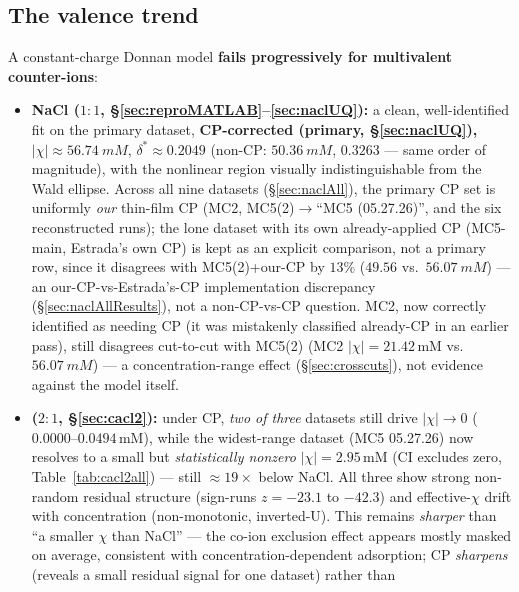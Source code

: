 \documentclass[11pt]{article}
\newcommand{\dstar}{\delta^{*}}
\begin{document}
\subsection{The valence trend}\label{sec:valencetrend}
A constant-charge Donnan model \textbf{fails progressively for
multivalent counter-ions}:
\begin{itemize}[itemsep=2pt]
  \item \textbf{NaCl ($1{:}1$, \S\ref{sec:reproMATLAB}--\ref{sec:naclUQ}):} a
        clean, well-identified fit on the primary dataset, \textbf{CP-corrected
        (primary, \S\ref{sec:naclUQ}), $|\chi|\approx\SI{56.74}{mM}$},
        $\dstar\approx0.2049$ (non-CP: $\SI{50.36}{mM}$, $0.3263$ --- same order
        of magnitude), with the
        nonlinear region visually indistinguishable from the Wald ellipse.
        Across all nine datasets (\S\ref{sec:naclAll}), the primary CP set is
        uniformly \emph{our} thin-film CP (MC2, MC5(2)$\to$``MC5 (05.27.26)'',
        and the six reconstructed runs); the lone dataset with its own
        already-applied CP
        (MC5-main, Estrada's own CP) is kept as an explicit comparison, not a primary row, since
        it disagrees with MC5(2)+our-CP by $13\%$ ($49.56$ vs.\
        $\SI{56.07}{mM}$) --- an our-CP-vs-Estrada's-CP implementation
        discrepancy (\S\ref{sec:naclAllResults}), not a non-CP-vs-CP question.
        MC2, now correctly identified as needing CP (it was mistakenly
        classified already-CP in an earlier pass), still disagrees
        cut-to-cut with MC5(2) (MC2 $|\chi|=21.42$\,mM vs.\ $\SI{56.07}{mM}$) ---
        a concentration-range
        effect
        (\S\ref{sec:crosscuts}), not evidence against the model itself.
  \item \textbf{\ce{CaCl2} ($2{:}1$, \S\ref{sec:cacl2}):} under CP, \emph{two
        of three} datasets still drive $|\chi|\to0$ ($0.0000$--$0.0494$\,mM), while
        the widest-range dataset (MC5 05.27.26) now resolves to a small but
        \emph{statistically nonzero} $|\chi|=2.95$\,mM (CI excludes zero,
        Table~\ref{tab:cacl2all}) --- still $\approx19\times$ below NaCl. All three
        show strong non-random residual structure
        (sign-runs $z=-23.1$ to $-42.3$) and effective-$\chi$ drift with
        concentration (non-monotonic, inverted-U). This remains \emph{sharper}
        than ``a smaller $\chi$ than NaCl'' --- the co-ion exclusion effect
        appears mostly masked on average, consistent with
        concentration-dependent  adsorption; CP \emph{sharpens}
        (reveals a small residual signal for one dataset) rather than

\end{itemize}
\end{document}
